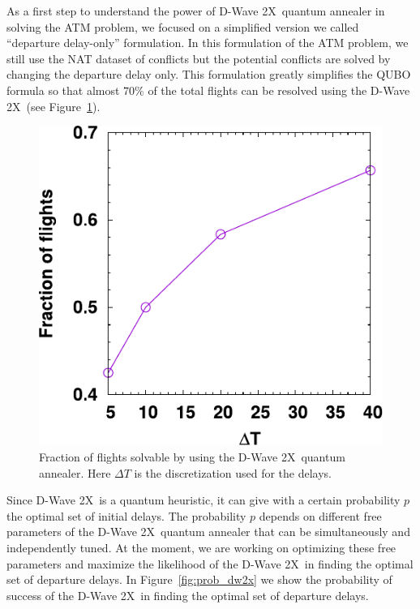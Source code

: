 \documentclass[twocolumn,9pt]{article}
\renewcommand{\figurename}{Figure}
\newcommand{\DW}{D-Wave 2X}
\begin{document}
As a first step to understand the power of \DW~quantum annealer in solving the ATM problem, we focused
on a simplified version we called ``departure delay-only'' formulation. In this formulation of the
ATM problem, we still use the NAT dataset of conflicts but the potential conflicts are solved by
changing the departure delay only. This formulation greatly simplifies the QUBO formula so that 
almost $70\%$ of the total flights can be resolved using the \DW~(see \figurename~\ref{fig:solvable_dw2x}).
%
\begin{figure}[h!]
\centering
\includegraphics[scale=0.8]{images/fraction-flights-solvable-dw2x.pdf}
\caption{\label{fig:solvable_dw2x}Fraction of flights solvable by using the \DW~quantum annealer. Here
$\Delta T$ is the discretization used for the delays.}
\end{figure}
%
Since \DW~is a quantum heuristic, it can give with a certain probability $p$ the optimal set of initial 
delays. The probability $p$ depends on different free parameters of the \DW~quantum annealer 
that can be simultaneously and independently tuned. At the moment, we are working on optimizing these
free parameters and maximize the likelihood of the \DW~in finding the optimal set of departure delays.
In \figurename~\ref{fig:prob_dw2x} we show the probability of success of the \DW~in finding the 
optimal set of departure delays.
%
\end{document}
